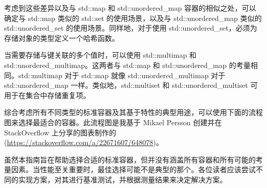 考虑到这些差异以及与 std::map 和 std::unordered\_map 容器的相似之处，可以确定与 std::map 类似的 std::set 的使用场景，以及与 std::unordered\_map 类似的 std::unordered\_set 的使用场景。同样地，对于使用 std::unordered\_set，必须为存储对象的类型定义一个哈希函数。

当需要存储与键关联的多个值时，可以使用 std::multimap 和 std::unordered\_multimap。这两者与 std::map 和 std::unordered\_map 的考量相同。std::multimap 对于 std::map 就像 std::unordered\_multimap 对于 std::unordered\_map 一样。类似地，std::multiset 和 std::unordered\_multiset 可用于在集合中存储重复项。

综合考虑所有不同类型的标准容器及其基于特性的典型用途，可以使用下面的流程图来选择最适合的容器。此流程图是我基于 Mikael Persson 创建并在 StackOverflow 上分享的图表制作的 (\url{https://stackoverflow.com/a/22671607/648078})。


\begin{myTip}
虽然本指南旨在帮助选择合适的标准容器，但并没有涵盖所有容器和所有可能的考量因素。当性能至关重要时，最佳选择可能不是典型的那个。各位读者应该尝试不同的实现方案，对其进行基准测试，并根据测量结果来决定解决方案。
\end{myTip}
